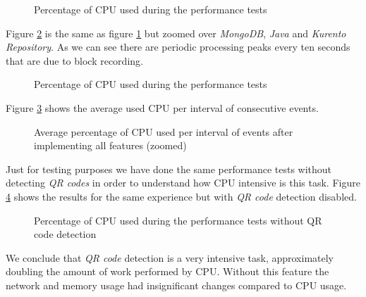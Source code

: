 \begin{figure}[!htb]
  \begin{center}
    
  \end{center}
  \caption{Percentage of CPU used during the performance tests}
  \label{fig:test_full_features_cpu}
\end{figure}

Figure \ref{fig:test_full_features_cpu_zoom} is the same as figure \ref{fig:test_full_features_cpu} but zoomed over \emph{MongoDB}, \emph{Java} and \emph{Kurento Repository}. As we can see there are periodic processing peaks every ten seconds that are due to block recording. 

\begin{figure}[!htb]
  \begin{center}
    
  \end{center}
  \caption{Percentage of CPU used during the performance tests}
  \label{fig:test_full_features_cpu_zoom}
\end{figure}

   Figure \ref{fig:summary_full_cpu} shows the average used \ac{CPU} per interval of consecutive events. 

\begin{figure}[!htb]
  \begin{center}
    
  \end{center}
  \caption{Average percentage of CPU used per interval of events after implementing all features (zoomed)}
  \label{fig:summary_full_cpu}
\end{figure}

  Just for testing purposes we have done the same performance tests without detecting \emph{QR codes} in order to understand how \ac{CPU} intensive is this task. Figure \ref{fig:test_without_qrcode_cpu} shows the results for the same experience but with \emph{QR code} detection disabled.

  \begin{figure}[!htb]
  \begin{center}
    
  \end{center}
  \caption{Percentage of CPU used during the performance tests without QR code detection}
  \label{fig:test_without_qrcode_cpu}
\end{figure}

We conclude that \emph{QR code} detection is a very intensive task, approximately doubling the amount of work performed by \ac{CPU}. Without this feature the network and memory usage had insignificant changes compared to \ac{CPU} usage.

